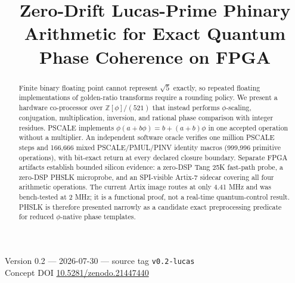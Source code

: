 \documentclass[conference]{IEEEtran}
\title{Zero-Drift Lucas-Prime Phinary Arithmetic for Exact Quantum Phase Coherence on FPGA}
\author{
\IEEEauthorblockN{John Curley}
\IEEEauthorblockA{Independent Researcher, SPU-13 Project\\
Email: \href{mailto:johncurley@pinnacletechglobal.com}{johncurley@pinnacletechglobal.com}}
}
\begin{document}
\maketitle

\begin{center}\footnotesize
Version 0.2 --- 2026-07-30 --- source tag \texttt{v0.2-lucas}\\
Concept DOI \href{https://doi.org/10.5281/zenodo.21447440}{10.5281/zenodo.21447440}
\end{center}

\begin{abstract}
Finite binary floating point cannot represent $\sqrt{5}$ exactly, so repeated
floating implementations of golden-ratio transforms require a rounding policy.
We present a hardware co-processor over $\mathbb{Z}[\phi]/(521)$ that instead
performs $\phi$-scaling, conjugation, multiplication, inversion, and rational
phase comparison with integer residues. PSCALE implements
$\phi(a+b\phi)=b+(a+b)\phi$ in one accepted operation without a multiplier.
An independent software oracle verifies one million PSCALE steps and 166,666
mixed PSCALE/PMUL/PINV identity macros (999,996 primitive operations), with
bit-exact return at every declared closure boundary. Separate FPGA artifacts
establish bounded silicon evidence: a zero-DSP Tang 25K fast-path probe, a
zero-DSP PHSLK microprobe, and an SPI-visible Artix-7 sidecar covering all four
arithmetic operations. The current Artix image routes at only 4.41 MHz and was
bench-tested at 2 MHz; it is a functional proof, not a real-time quantum-control
result. PHSLK is therefore presented narrowly as a candidate exact
preprocessing predicate for reduced $\phi$-native phase templates.
\end{abstract}

\vspace{0.5em}
\noindent{}
\vspace{0.5em}
\end{document}
